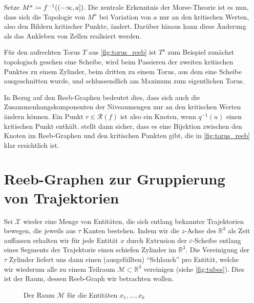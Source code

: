 Setze $M^a \coloneqq f^{-1}\enbrace*{(-\infty,a]}$.
Die zentrale Erkenntnis der Morse-Theorie ist es nun, dass sich die Topologie von $M^a$ bei Variation von $a$ nur an den kritischen Werten, also den Bildern kritischer Punkte, ändert.
Darüber hinaus kann diese Änderung als das Ankleben von Zellen realisiert werden.

Für den aufrechten Torus $T$ aus \cref{fig:torus_reeb} ist $T^a$ zum Beispiel zunächst topologisch gesehen eine Scheibe, wird beim Passieren der zweiten kritischen Punktes zu einem Zylinder, beim dritten zu einem Torus, aus dem eine Scheibe ausgeschnitten wurde, und schlussendlich am Maximum zum eigentlichen Torus.

In Bezug auf den Reeb-Graphen bedeutet dies, dass sich auch die Zusammenhangskomponenten der Niveaumengen nur an den kritischen Werten ändern können.
Ein Punkt $r \in \mathcal{R}(f)$ ist also ein Knoten, wenn $q^{-1}(u)$ einen kritischen Punkt enthält.
 stellt dann sicher, dass es eine Bijektion zwischen den Knoten im Reeb-Graphen und den kritischen Punkten gibt, die in \cref{fig:torus_reeb} klar ersichtlich ist.



\section{Reeb-Graphen zur Gruppierung von Trajektorien} %
\label{sec:trajek_reeb}
Sei $\mathcal{X}$ wieder eine Menge von Entitäten, die sich entlang bekannter Trajektorien bewegen, die jeweils aus $\tau$ Kanten bestehen.
Indem wir die $z$-Achse des $\mathbb{R}^3$ als Zeit auffassen erhalten wir für jede Entität $x$ durch Extrusion der $\varepsilon$-Scheibe entlang eines Segments der Trajektorie einen schiefen Zylinder im $\mathbb{R}^3$.
Die Vereinigung der $\tau$ Zylinder liefert uns dann einen (ausgefüllten) \enquote{Schlauch} pro Entität, welche wir wiederum alle zu einem Teilraum $\mathcal{M} \subset \mathbb{R}^3$ vereinigen (siehe \cref{fig:tubes}).
Dies ist der Raum, dessen Reeb-Graph wir betrachten wollen.

\begin{figure}
	\Centering
	\hspace{1em}
	\label{fig:reeb_graph}
	\caption{Der Raum $\mathcal{M}$ für die Entitäten $x_1, \ldots ,x_k$}
\end{figure}

